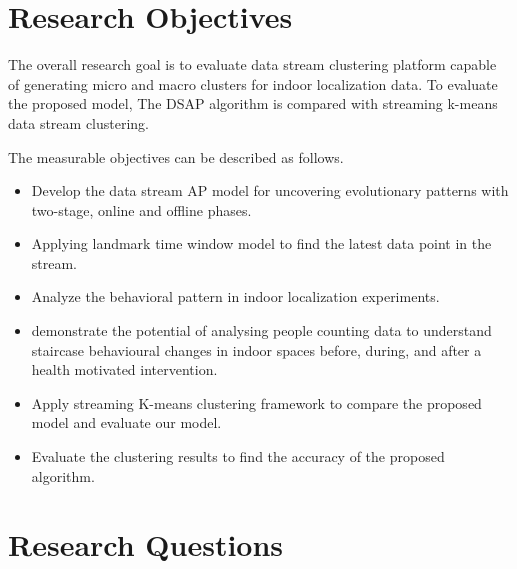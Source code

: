 \section{Research Objectives}

The overall research goal is to evaluate data stream clustering platform capable of generating micro and macro clusters for indoor localization data. To evaluate the proposed model, The DSAP algorithm is compared with streaming k-means data stream clustering.

The measurable objectives can be described as follows. 

\begin{itemize}
    \item Develop the data stream AP model for uncovering evolutionary patterns with two-stage, online and offline phases.
     \item Applying landmark time window model to find the latest data point in the stream.
   
    \item Analyze the behavioral pattern in indoor localization experiments.
    \item demonstrate the potential of analysing people counting data to understand staircase behavioural changes in indoor spaces before, during, and after a health motivated intervention.
    \item Apply streaming K-means clustering framework to compare the proposed model and evaluate our model.
    \item Evaluate the clustering results to find the accuracy of the proposed algorithm.




\end{itemize}
 

\section{Research Questions}


